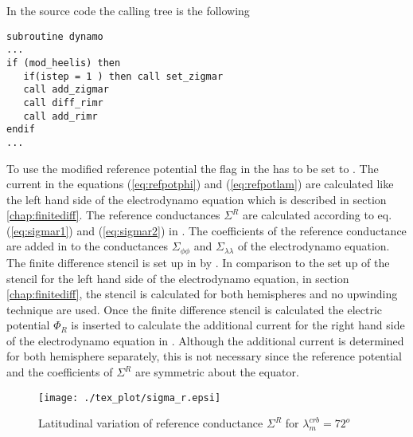 In the source code the calling tree is the
following
%
\begin{verbatim}
subroutine dynamo
...
if (mod_heelis) then
   if(istep = 1 ) then call set_zigmar
   call add_zigmar
   call diff_rimr
   call add_rimr
endif
...
\end{verbatim}
%
To use the modified reference potential the flag 
 in the   has to be set to . 
The current in the equations (\ref{eq:refpotphi}) and (\ref{eq:refpotlam})
are calculated like the left hand side of the electrodynamo equation 
which is described in section
\ref{chap:finitediff}. The reference conductances 
$\Sigma^R$ are calculated according to eq. (\ref{eq:sigmar1}) and 
(\ref{eq:sigmar2}) in . 
The coefficients of the reference conductance are added 
in  to the conductances 
$\Sigma_{\phi \phi}$ and $\Sigma_{\lambda \lambda}$ of the electrodynamo equation.
The finite difference stencil is set up in
 by
. In comparison to the set up of the stencil for 
the left hand side of the electrodynamo equation, in section
\ref{chap:finitediff}, the stencil is calculated for both hemispheres and no
upwinding technique are used. Once the finite difference stencil is 
calculated the electric
potential $\Phi_R$ is inserted to calculate the additional 
current for the right hand side of the electrodynamo equation
in . Although the additional current
is determined  for both hemisphere separately,
this is not necessary since the reference  potential and the coefficients 
of $\Sigma^R$
are symmetric about the equator.
%
%
\begin{figure}
  \centering
  \texttt{[image: ./tex\_plot/sigma\_r.epsi]}
  \caption{Latitudinal variation of reference conductance 
    $\Sigma^R$ for  $\lambda_m^{crb}= 72^o$  }
   \label{fig:sigma_r}
\end{figure}
%
%
